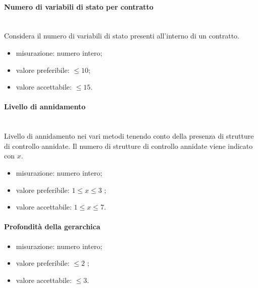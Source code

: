 			\paragraph*{Numero di variabili di stato per contratto}
			\mbox{}\\
			Considera il numero di variabili di stato presenti
			all'interno di un contratto.
			\begin{itemize}
				\item misurazione: numero intero;
				\item valore preferibile: $\leq 10$;
				\item valore accettabile: $\leq 15$.
			\end{itemize}
		
			\paragraph*{Livello di annidamento}
			\mbox{}\\
			Livello di annidamento nei vari metodi tenendo conto della
			presenza di strutture di controllo annidate. Il numero di strutture di controllo annidate viene indicato con $x$.
			\begin{itemize}
				\item misurazione: numero intero;
				\item valore preferibile: $ 1 \leq x \leq3$ ;
				\item valore accettabile: $1 \leq x\leq 7$.
			\end{itemize}
		
			\paragraph*{Profondità della gerarchica}
			\begin{itemize}
				\item misurazione: numero intero;
				\item valore preferibile: $ \leq 2$ ;
				\item valore accettabile: $ \leq 3$.
			\end{itemize}
			\begin{comment}
			
			\paragraph*{Numero di parametri per metodo}
			\begin{itemize}
				\item misurazione: numero intero;
				\item valore preferibile: $ \leq 3$ ;
				\item valore accettabile: $ \leq 5$.
			\end{itemize}
			\end{comment}
			
